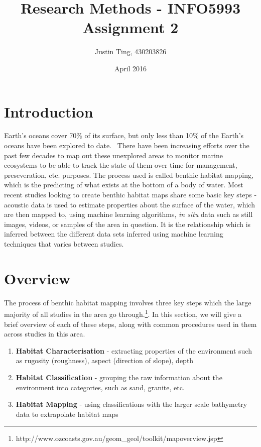 \documentclass[12pt]{article}
\title{Research Methods - INFO5993 Assignment 2}
\author{Justin Ting, 430203826}
\date{April 2016}
\begin{document}
\maketitle

        \begin{multicols}{2}
            \section{Introduction}

            Earth's oceans cover 70\% of its surface, but only less than 10\% of the Earth's oceans have been explored to date.~\citep{NOAA} There have been increasing efforts over the past few decades to map out these unexplored areas to monitor marine ecosystems to be able to track the state of them over time for management, preseveration, etc. purposes. The process used is called benthic habitat mapping, which is the predicting of what exists at the bottom of a body of water. Most recent studies looking to create benthic habitat maps share some basic key steps - acoustic data is used to estimate properties about the surface of the water, which are then mapped to, using machine learning algorithms, \textit{in situ} data such as still images, videos, or samples of the area in question. It is the relationship which is inferred between the different data sets inferred using machine learning techniques that varies between studies.

            \section{Overview}
            The process of benthic habitat mapping involves three key steps which the large majority of all studies in the area go through.\footnote{http://www.ozcoasts.gov.au/geom\_geol/toolkit/mapoverview.jsp}. In this section, we will give a brief overview of each of these steps, along with common procedures used in them across studies in this area.

            \begin{enumerate}
                \item \textbf{Habitat Characterisation} - extracting properties of the environment such as rugosity (roughness), aspect (direction of slope), depth
                \item \textbf{Habitat Classification} - grouping the raw information about the environment into categories, such as sand, granite, etc.
                \item \textbf{Habitat Mapping} - using classifications with the larger scale bathymetry data to extrapolate habitat maps 
            \end{enumerate}


\end{multicols}
\end{document}
